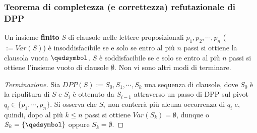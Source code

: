 \subsubsection{Teorema di completezza (e correttezza) refutazionale di DPP}
\begin{teo}
        Un insieme \textbf{finito} $S$ di clausole nelle lettere proposizionali 
        $p_1, p_2, \cdots, p_n$ ($:= Var(S)$) è insoddisfacibile se e solo se 
        entro al più $n$ passi si ottiene la clausola vuota $\qedsymbol$. 
        $S$ è soddisfacibile se e solo se entro al più $n$ passi si ottiene 
        l'insieme vuoto di clausole $\emptyset$.
        Non vi sono altri modi di terminare. 
\end{teo}

\begin{proof}[Terminazione]
        Sia $DPP(S) := S_0, S_1, \cdots, S_k$ una sequenza di clausole, dove
        $S_0$ è la ripulitura di $S$ e $S_i$ è ottenuto da $S_{i-1}$ attraverso un 
        passo di DPP sul pivot $q_i \in \{p_1, \cdots, p_n\}$.
        Si osserva che $S_i$ non conterrà più alcuna occorrenza di $q_i$ e, quindi, 
        dopo al più $k \leq n$ passi si ottiene $Var(S_k) = \emptyset$, dunque 
        o $S_k = \{ \qedsymbol \}$ oppure $S_k = \emptyset$. 
\end{proof}

